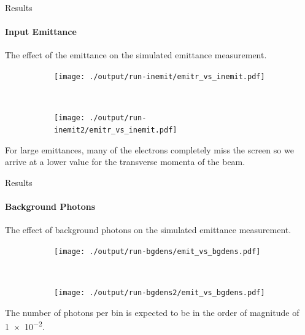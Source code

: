 \documentclass[aspectratio=169]{beamer}
\begin{document}
\begin{frame}{Results}
	\framesubtitle{Input Emittance}
	The effect of the emittance on the simulated emittance measurement.\\
	\begin{figure}
		\centering
		\begin{subfigure}[b]{0.45\textwidth}
			\centering
			\texttt{[image: ./output/run-inemit/emitr\_vs\_inemit.pdf]}
		\end{subfigure}%
		~
		\begin{subfigure}[b]{0.55\textwidth}
			\centering
			\texttt{[image: ./output/run-inemit2/emitr\_vs\_inemit.pdf]}
		\end{subfigure}
	\end{figure}

	For large emittances, many of the electrons completely miss the screen so
	we arrive at a lower value for the transverse momenta of the beam.
\end{frame}

\begin{frame}[t]{Results}
	\framesubtitle{Background Photons}
	The effect of background photons on the simulated emittance measurement.\\

	\begin{figure}[!t]
		\centering
		\vspace*{-1em}
		\begin{subfigure}[t]{0.45\textwidth}
			\centering
			\texttt{[image: ./output/run-bgdens/emit\_vs\_bgdens.pdf]}
		\end{subfigure}%
		~
		\begin{subfigure}[t]{0.55\textwidth}
			\centering
			\texttt{[image: ./output/run-bgdens2/emit\_vs\_bgdens.pdf]}
		\end{subfigure}%
	\end{figure}

	The number of photons per bin is expected to be in the order of magnitude of \num{1e-2}.
\end{frame}
\end{document}
